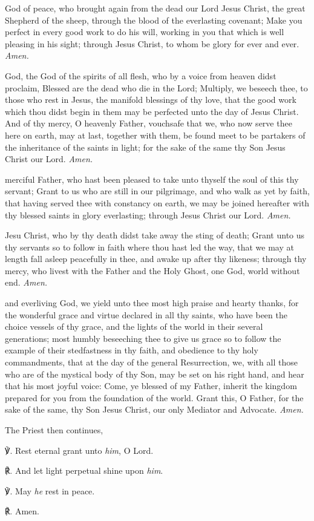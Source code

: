  God of peace, who brought again from the dead our Lord Jesus Christ, the great Shepherd of the sheep, through the blood of the everlasting covenant; Make you perfect in every good work to do his will, working in you that which is well pleasing in his sight; through Jesus Christ, to whom be glory for ever and ever. \textit{Amen.}

 God, the God of the spirits of all flesh, who by a voice from heaven didst proclaim, Blessed are the dead who die in the Lord; Multiply, we beseech thee, to those who rest in Jesus, the manifold blessings of thy love, that the good work which thou didst begin in them may be perfected unto the day of Jesus Christ. And of thy mercy, O heavenly Father, vouchsafe that we, who now serve thee here on earth, may at last, together with them, be found meet to be partakers of the inheritance of the saints in light; for the sake of the same thy Son Jesus Christ our Lord. \textit{Amen.}\par

 merciful Father, who hast been pleased to take unto thyself the soul of this thy servant; Grant to us who are still in our pilgrimage, and who walk as yet by faith, that having served thee with constancy on earth, we may be joined hereafter with thy blessed saints in glory everlasting; through Jesus Christ our Lord. \textit{Amen.}\par

 Jesu Christ, who by thy death didst take away the sting of death; Grant unto us thy servants so to follow in faith where thou hast led the way, that we may at length fall asleep peacefully in thee, and awake up after thy likeness; through thy mercy, who livest with the Father and the Holy Ghost, one God, world without end. \textit{Amen.}\par

 and everliving God, we yield unto thee most high praise and hearty thanks, for the wonderful grace and virtue declared in all thy saints, who have been the choice vessels of thy grace, and the lights of the world in their several generations; most humbly beseeching thee to give us grace so to follow the example of their stedfastness in thy faith, and obedience to thy holy commandments, that at the day of the general Resurrection, we, with all those who are of the mystical body of thy Son, may be set on his right hand, and hear that his most joyful voice: Come, ye blessed of my Father, inherit the kingdom prepared for you from the foundation of the world. Grant this, O Father, for the sake of the same, thy Son Jesus Christ, our only Mediator and Advocate. \textit{Amen.}\par
\begin{rubric}
	The Priest then continues,
\end{rubric}
℣. Rest eternal grant unto \textit{him}, O Lord.\par
℟. And let light perpetual shine upon \textit{him}.\par
℣. May \textit{he} rest in peace.\par
℟. Amen.

